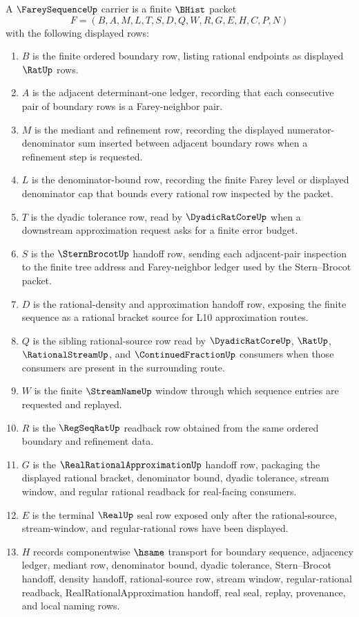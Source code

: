 \begin{definition}
\label{def:farey-sequence-carrier}
A $\FareySequenceUp$ carrier is a finite $\BHist$ packet
$$
F=(B,A,M,L,T,S,D,Q,W,R,G,E,H,C,P,N)
$$
with the following displayed rows:
\begin{enumerate}
\item $B$ is the finite ordered boundary row, listing rational endpoints as displayed $\RatUp$ rows.
\item $A$ is the adjacent determinant-one ledger, recording that each consecutive pair of boundary rows is a Farey-neighbor pair.
\item $M$ is the mediant and refinement row, recording the displayed numerator-denominator sum inserted between adjacent boundary rows when a refinement step is requested.
\item $L$ is the denominator-bound row, recording the finite Farey level or displayed denominator cap that bounds every rational row inspected by the packet.
\item $T$ is the dyadic tolerance row, read by $\DyadicRatCoreUp$ when a downstream approximation request asks for a finite error budget.
\item $S$ is the $\SternBrocotUp$ handoff row, sending each adjacent-pair inspection to the finite tree address and Farey-neighbor ledger used by the Stern--Brocot packet.
\item $D$ is the rational-density and approximation handoff row, exposing the finite sequence as a rational bracket source for L10 approximation routes.
\item $Q$ is the sibling rational-source row read by $\DyadicRatCoreUp$, $\RatUp$, $\RationalStreamUp$, and $\ContinuedFractionUp$ consumers when those consumers are present in the surrounding route.
\item $W$ is the finite $\StreamNameUp$ window through which sequence entries are requested and replayed.
\item $R$ is the $\RegSeqRatUp$ readback row obtained from the same ordered boundary and refinement data.
\item $G$ is the $\RealRationalApproximationUp$ handoff row, packaging the displayed rational bracket, denominator bound, dyadic tolerance, stream window, and regular rational readback for real-facing consumers.
\item $E$ is the terminal $\RealUp$ seal row exposed only after the rational-source, stream-window, and regular-rational rows have been displayed.
\item $H$ records componentwise $\hsame$ transport for boundary sequence, adjacency ledger, mediant row, denominator bound, dyadic tolerance, Stern--Brocot handoff, density handoff, rational-source row, stream window, regular-rational readback, RealRationalApproximation handoff, real seal, replay, provenance, and local naming rows.

\end{enumerate}
\end{definition}
